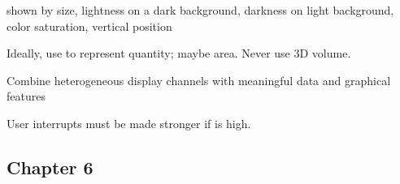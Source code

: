 \begin{compactenum}
    \item {} shown by size, lightness on a dark background, darkness
        on light background, color saturation, vertical position

    \item Ideally, use  to represent quantity; maybe
        area. Never use 3D volume.

    \item Combine heterogeneous display channels with meaningful  data and graphical features

    \item User interrupts must be made stronger if  is high.

\end{compactenum}

\subsection{Chapter 6}


